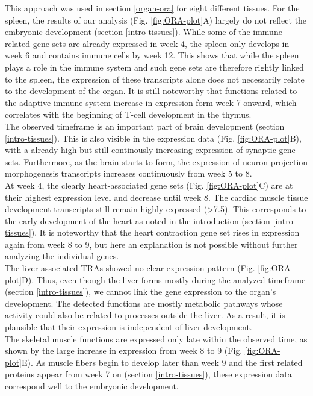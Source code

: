 \documentclass[
]{article}
\begin{document}
This approach was used in section \ref{organ-ora} for eight different tissues.
For the spleen, the results of our analysis (Fig. \ref{fig:ORA-plot}A) largely do not reflect the embryonic development (section \ref{intro-tissues}). While some of the immune-related gene sets are already expressed in week 4, the spleen only develops in week 6 and contains immune cells by week 12. This shows that while the spleen plays a role in the immune system and such gene sets are therefore rightly linked to the spleen, the expression of these transcripts alone does not necessarily relate to the development of the organ. It is still noteworthy that functions related to the adaptive immune system increase in expression form week 7 onward, which correlates with the beginning of T-cell development in the thymus.\\
The observed timeframe is an important part of brain development (section \ref{intro-tissues}). This is also visible in the expression data (Fig. \ref{fig:ORA-plot}B), with a already high but still continously increasing expression of synaptic gene sets. Furthermore, as the brain starts to form, the expression of neuron projection morphogenesis transcripts increases continuously from week 5 to 8.\\
At week 4, the clearly heart-associated gene sets (Fig. \ref{fig:ORA-plot}C) are at their highest expression level and decrease until week 8. The cardiac muscle tissue development transcripts still remain highly expressed (\textgreater7.5). This corresponds to the early development of the heart as noted in the introduction (section \ref{intro-tissues}). It is noteworthy that the heart contraction gene set rises in expression again from week 8 to 9, but here an explanation is not possible without further analyzing the individual genes.\\
The liver-associated TRAs showed no clear expression pattern (Fig. \ref{fig:ORA-plot}D). Thus, even though the liver forms mostly during the analyzed timeframe (section \ref{intro-tissues}), we cannot link the gene expression to the organ's development. The detected functions are mostly metabolic pathways whose activity could also be related to processes outside the liver. As a result, it is plausible that their expression is independent of liver development.\\
The skeletal muscle functions are expressed only late within the observed time, as shown by the large increase in expression from week 8 to 9 (Fig. \ref{fig:ORA-plot}E). As muscle fibers begin to develop later than week 9 and the first related proteins appear from week 7 on (section \ref{intro-tissues}), these expression data correspond well to the embryonic development.\\
\end{document}
